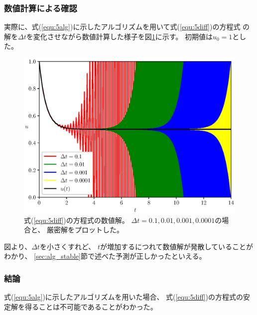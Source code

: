 \documentclass[a4j, titlepage]{jsarticle}
\numberwithin{equation}{section}
\begin{document}
        \subsubsection{数値計算による確認}
            実際に、式(\ref{equ:5alg})に示したアルゴリズムを用いて式(\ref{equ:5diff})の方程式
            の解を$\Delta t$を変化させながら数値計算した様子を図\ref{fig:5}に示す。
            初期値は$u_0 = 1$とした。

            \begin{figure}[h]
                \centering
                \includegraphics[width=0.8\hsize]{kadai5/kadai5.eps}
                \caption{
                    式(\ref{equ:5diff})の方程式の数値解。
                    $\Delta t = 0.1, 0.01, 0.001, 0.0001$の場合と、
                    厳密解をプロットした。
                }
                \label{fig:5}
            \end{figure}

            図より、$\Delta t$を小さくすれど、
            $t$が増加するにつれて数値解が発散していることがわかり、
            \ref{sec:alg_stable}節で述べた予測が正しかったといえる。

        \subsubsection{結論}
            式(\ref{equ:5alg})に示したアルゴリズムを用いた場合、
            式(\ref{equ:5diff})の方程式の安定解を得ることは不可能であることがわかった。
\end{document}
